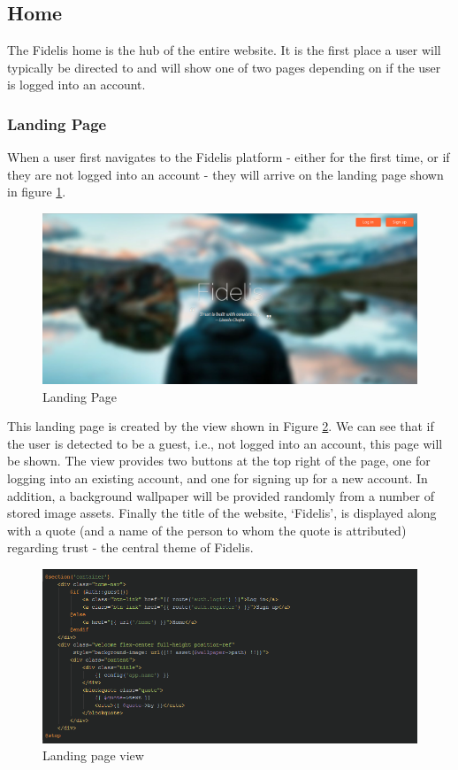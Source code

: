 \subsection{Home}
The Fidelis home is the hub of the entire website. It is the first place a user will typically be directed to and will show one of two pages depending on if the user is logged into an account.

\subsubsection{Landing Page}
When a user first navigates to the Fidelis platform - either for the first time, or if they are not logged into an account - they will arrive on the landing page shown in figure \ref{fig:HomeUnauthorised}.  

\begin{figure}[H]
\centering
\includegraphics[width=\textwidth]{Images/Implementation/home_unauthorised}
\caption{Landing Page}
\label{fig:HomeUnauthorised}
\end{figure}

This landing page is created by the view shown in Figure \ref{fig:LandingView}. We can see that if the user is detected to be a guest, i.e., not logged into an account, this page will be shown. The view provides two buttons at the top right of the page, one for logging into an existing account, and one for signing up for a new account. In addition, a background wallpaper will be provided randomly from a number of stored image assets. Finally the title of the website, `Fidelis', is displayed along with a quote (and a name of the person to whom the quote is attributed) regarding trust - the central theme of Fidelis.

\begin{figure}[H]
\centering
\includegraphics[width=\textwidth]{Images/Implementation/LandingView}
\caption{Landing page view}
\label{fig:LandingView}
\end{figure}

